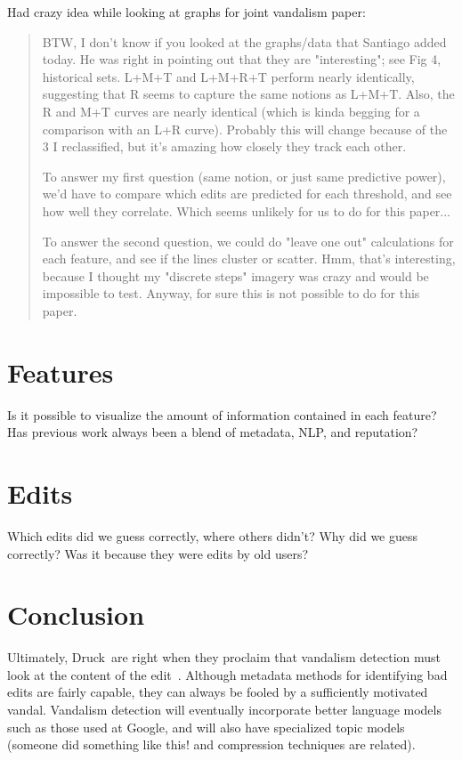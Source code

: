 Had crazy idea while looking at graphs for joint vandalism paper:
\begin{quote}
BTW, I don't know if you looked at the graphs/data that Santiago added today.  He was right in pointing out that they are "interesting"; see Fig 4, historical sets.  L+M+T and L+M+R+T perform nearly identically, suggesting that R seems to capture the same notions as L+M+T.  Also, the R and M+T curves are nearly identical (which is kinda begging for a comparison with an L+R curve).  Probably this will change because of the 3 I reclassified, but it's amazing how closely they track each other.

To answer my first question (same notion, or just same predictive power), we'd have to compare which edits are predicted for each threshold, and see how well they correlate.  Which seems unlikely for us to do for this paper...

To answer the second question, we could do "leave one out" calculations for each feature, and see if the lines cluster or scatter.  Hmm, that's interesting, because I thought my "discrete steps" imagery was crazy and would be impossible to test.  Anyway, for sure this is not possible to do for this paper.
\end{quote}


    \section{Features}
        Is it possible to visualize the amount of information
        contained in each feature?
        Has previous work always been a blend of metadata, NLP,
        and reputation?
    \section{Edits}
        Which edits did we guess correctly, where others didn't?
        Why did we guess correctly?  Was it because they were edits
        by old users?

\section{Conclusion}

        Ultimately, Druck~\etal are right when they proclaim that
        vandalism detection must look at the content of the
        edit~\cite{Druck2008}.
        Although metadata methods for identifying bad edits are
        fairly capable, they can always be fooled by a sufficiently
        motivated vandal.
        Vandalism detection will eventually incorporate better
        language models such as those used at Google,
        and will also have specialized topic models (someone did
        something like this!  and compression techniques are
        related).


